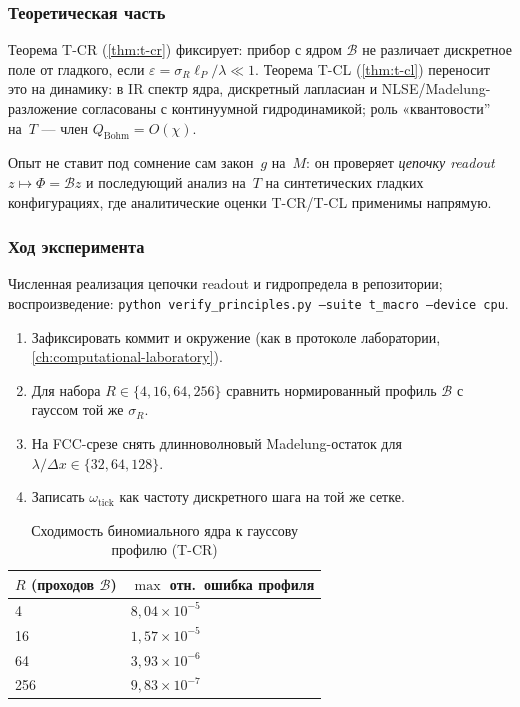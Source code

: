 \subsubsection*{Теоретическая часть}
Теорема T-CR (\cref{thm:t-cr}) фиксирует: прибор с ядром $\mathcal{B}$ не различает дискретное поле от гладкого,
если $\varepsilon=\sigma_R\ell_P/\lambda\ll 1$.
Теорема T-CL (\cref{thm:t-cl}) переносит это на динамику: в IR спектр ядра, дискретный лапласиан и NLSE/Madelung-разложение
согласованы с континуумной гидродинамикой; роль «квантовости'' на~$T$ --- член $Q_{\mathrm{Bohm}}=O(\chi)$.

Опыт не ставит под сомнение сам закон~$g$ на~$M$: он проверяет \emph{цепочку readout} $z\mapsto\Phi=\mathcal{B}z$ и последующий анализ на~$T$
на синтетических гладких конфигурациях, где аналитические оценки T-CR/T-CL применимы напрямую.

\subsubsection*{Ход эксперимента}
Численная реализация цепочки readout и гидропредела в репозитории; воспроизведение:
\texttt{python verify\_principles.py --suite t\_macro --device cpu}.

\begin{enumerate}[label=\textbf{Шаг \arabic*:},leftmargin=*,itemsep=0.35em]
\item Зафиксировать коммит и окружение (как в протоколе лаборатории, \cref{ch:computational-laboratory}).
\item Для набора $R\in\{4,16,64,256\}$ сравнить нормированный профиль $\mathcal{B}$ с гауссом той же $\sigma_R$.
\item На FCC-срезе снять длинноволновый Madelung-остаток для $\lambda/\Delta x\in\{32,64,128\}$.
\item Записать $\omega_{\mathrm{tick}}$ как частоту дискретного шага на той же сетке.
\end{enumerate}

\begin{table}[htbp]
\centering
\small
\caption{Сходимость биномиального ядра к гауссову профилю (T-CR)}
\label{tab:exp-ce-m-01-gauss}
\begin{tabular}{@{}ll@{}}
\toprule
$R$ (проходов $\mathcal{B}$) & $\max$ отн.\ ошибка профиля \\
\midrule
4 & $8{,}04\times 10^{-5}$ \\
16 & $1{,}57\times 10^{-5}$ \\
64 & $3{,}93\times 10^{-6}$ \\
256 & $9{,}83\times 10^{-7}$ \\
\bottomrule
\end{tabular}
\end{table}

